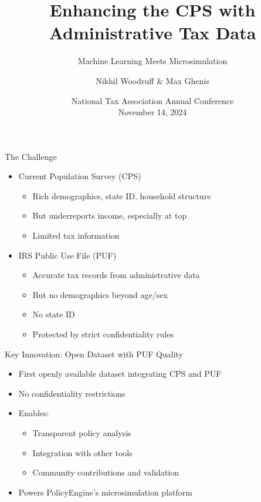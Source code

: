 \documentclass{beamer}
\title{Enhancing the CPS with Administrative Tax Data}
\subtitle{Machine Learning Meets Microsimulation}
\author[Woodruff \& Ghenis]{Nikhil Woodruff \& Max Ghenis}
\institute{PolicyEngine}
\date{National Tax Association Annual Conference\\November 14, 2024}
\begin{document}
\begin{frame}
    \titlepage
\end{frame}

\begin{frame}{The Challenge}
    \begin{itemize}
        \item Current Population Survey (CPS)
        \begin{itemize}
            \item Rich demographics, state ID, household structure
            \item But underreports income, especially at top
            \item Limited tax information
        \end{itemize}
        \pause
        \item IRS Public Use File (PUF)
        \begin{itemize}
            \item Accurate tax records from administrative data
            \item But no demographics beyond age/sex
            \item No state ID
            \item Protected by strict confidentiality rules
        \end{itemize}
    \end{itemize}
\end{frame}

\begin{frame}{Key Innovation: Open Dataset with PUF Quality}
    \begin{itemize}
        \item First openly available dataset integrating CPS and PUF
        \item No confidentiality restrictions
        \item Enables:
        \begin{itemize}
            \item Transparent policy analysis
            \item Integration with other tools
            \item Community contributions and validation
        \end{itemize}
        \item Powers PolicyEngine's microsimulation platform
    \end{itemize}
\end{frame}
\end{document}
